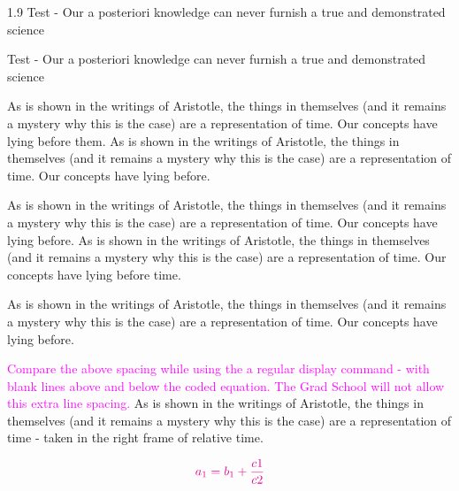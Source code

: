 \documentclass[12pt,chapterrefs,showgrid]{ndsu-thesis-2022}
\newcommand\myspacing{1.9} %
\begin{document}
\begin{spacing}{\myspacing}
Test - Our a posteriori knowledge can never furnish a true and demonstrated science

Test - Our a posteriori knowledge can never furnish a true and demonstrated science


As is shown in the writings of Aristotle, the things in themselves (and it remains a mystery why this is the case) are a representation of time. Our concepts have lying before them. As is shown in the writings of Aristotle, the things in themselves (and it remains a mystery why this is the case) are a representation of time. Our concepts have lying before.


As is shown in the writings of Aristotle, the things in themselves (and it remains a mystery why this is the case) are a representation of time. Our concepts have lying before. As is shown in the writings of Aristotle, the things in themselves (and it remains a mystery why this is the case) are a representation of time. Our concepts have lying before time. 



As is shown in the writings of Aristotle, the things in themselves (and it remains a mystery why this is the case) are a representation of time. Our concepts have lying before.

\textcolor{magenta}{Compare the above spacing while using the a regular display command - with blank lines above and below the coded equation. The Grad School will not allow this extra line spacing.} As is shown in the writings of Aristotle, the things in themselves (and it remains a mystery why this is the case) are a representation of time - taken in the right frame of relative time. 

\[
\textcolor{magenta}{a_1 =b_1+\frac{c1}{c2}} 
\]

\kant[2-3]

\makerefs%

\end{spacing}
\end{document}
